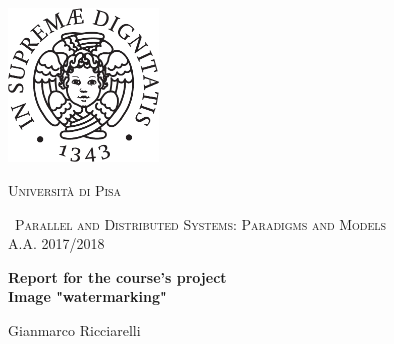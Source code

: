\begin{titlepage}
  \centering
  \includegraphics[width=0.30\textwidth]{imgs/cherubino_black.pdf}\par\vspace{1cm}
  {\scshape\LARGE Università di Pisa \par}
  \vspace{1cm}
  {\scshape\ Parallel and Distributed Systems: Paradigms and Models \\A.A. 2017/2018\par}
  \vspace{1.5cm}
  {\huge\bfseries Report for the course's project\\Image "watermarking"\par}
  \vspace{2cm}
  {\Large Gianmarco Ricciarelli \par}
  \vspace{2cm}
  \vfill
\end{titlepage}
